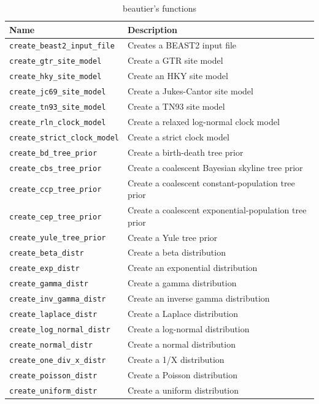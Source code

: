 \documentclass{article}
\begin{document}
\begin{table}[]
\centering
\begin{tabular}{ | l | l | }
\hline
\textbf{Name} & \textbf{Description} \\
\hline
\verb;create_beast2_input_file; & Creates a BEAST2 input file \\
\hline
\verb;create_gtr_site_model; & Create a GTR site model \cite{tavare1986some} \\
\verb;create_hky_site_model; & Create an HKY site model \cite{hasegawa1985dating} \\
\verb;create_jc69_site_model; & Create a Jukes-Cantor site model \cite{cantor1969mammalian} \\
\verb;create_tn93_site_model; & Create a TN93 site model \cite{tamura1993estimation} \\
\hline
\verb;create_rln_clock_model; & Create a relaxed log-normal clock model \cite{drummond2006relaxed} \\
\verb;create_strict_clock_model; & Create a strict clock model \cite{sarich1967immunological} \\
\hline
\verb;create_bd_tree_prior; & Create a birth-death tree prior \cite{kendall1948generalized} \\
\verb;create_cbs_tree_prior; & Create a coalescent Bayesian skyline tree prior \\
\verb;create_ccp_tree_prior; & Create a coalescent constant-population tree prior \\
\verb;create_cep_tree_prior; & Create a coalescent exponential-population tree prior \\
\verb;create_yule_tree_prior; & Create a Yule tree prior \cite{yule} \\
\hline
\verb;create_beta_distr; & Create a beta distribution \\
\verb;create_exp_distr; & Create an exponential distribution \\
\verb;create_gamma_distr; & Create a gamma distribution \\
\verb;create_inv_gamma_distr; & Create an inverse gamma distribution \\
\verb;create_laplace_distr; & Create a Laplace distribution \\
\verb;create_log_normal_distr; & Create a log-normal distribution \\
\verb;create_normal_distr; & Create a normal distribution \\
\verb;create_one_div_x_distr; & Create a 1/X distribution \\
\verb;create_poisson_distr; & Create a Poisson distribution \\
\verb;create_uniform_distr; & Create a uniform distribution \\
\hline
\end{tabular}
\caption{beautier's functions}
\label{tab:functions}
\end{table}
\end{document}

